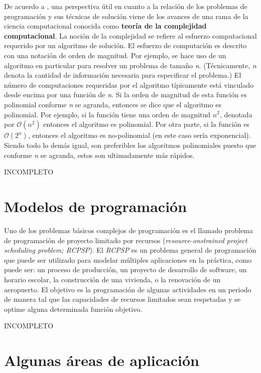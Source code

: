 \documentclass[spanish,draft,12pt,headsepline,footsepline,paper=letter]{scrreprt}
\newcommand{\BigO}{\ensuremath{\mathcal{O}}}%
\begin{document}
De acuerdo a \cite[p.~6]{Baker2009}, una perspectiva útil en cuanto a la relación de los problemas de programación y sus técnicas de solución viene de los avances de una rama de la ciencia computacional conocida como \textbf{teoría de la complejidad computacional}. La noción de la complejidad se refiere al esfuerzo computacional requerido por un algoritmo de solución. El esfuerzo de computación es descrito con una notación de orden de magnitud.
%
Por ejemplo, se hace uso de un algoritmo en particular para resolver un problema de tamaño \textit{n}. (Técnicamente, \textit{n} denota la cantidad de información necesaria para especificar el problema.) El número de computaciones requeridas por el algoritmo típicamente está vinculado desde encima por una función de \textit{n}. Si la orden de magnitud de esta función es polinomial conforme \textit{n} se agranda, entonces se dice que el algoritmo es polinomial.
%
Por ejemplo, si la función tiene una orden de magnitud $\textit{n}^2$, denotada por $\BigO(\textit{n}^2)$ entonces el algoritmo es polinomial. Por otra parte, si la función es $\BigO(2^\textit{n})$, entonces el algoritmo es no-polinomial (en este caso sería exponencial). Siendo todo lo demás igual, son preferibles los algoritmos polinomiales puesto que conforme \textit{n} se agranda, estos son ultimadamente más rápidos.

INCOMPLETO

\section{Modelos de programación}

Uno de los problemas básicos complejos de programación es el llamado problema de programación de proyecto limitado por recursos (\textit{resource-onstrained project scheduling problem; RCPSP}). El \textit{RCPSP} es un problema general de programación que puede ser utilizado para modelar múltiples aplicaciones en la práctica, como puede ser: un proceso de producción, un proyecto de desarrollo de software, un horario escolar, la construcción de una vivienda, o la renovación de un aeropuerto. El objetivo es la programación de algunas actividades en un periodo de manera tal que las capacidades de recursos limitados sean respetadas y se optime alguna determinada función objetivo.

INCOMPLETO

\section{Algunas áreas de aplicación}
\label{algunas_areas_aplicacion}
\end{document}
